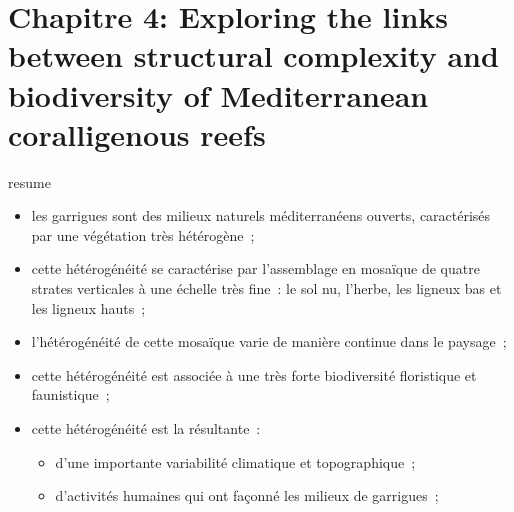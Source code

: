 \chapter[Exploring the links between structural complexity and biodiversity of Mediterranean coralligenous reefs]{Chapitre 4: Exploring the links between structural complexity and biodiversity of Mediterranean coralligenous reefs} \label{chapitre4-structure}

\pagestyle{main}



\begin{center}
\begin{colbox}{resume}
  \vspace{-2pt}
{\color{textresume}\small
\begin{itemize}[leftmargin=0in]\itemsep3pt
\item les garrigues sont des milieux naturels méditerranéens ouverts, caractérisés par une végétation très hétérogène~;
\item cette hétérogénéité se caractérise par l'assemblage en mosaïque de quatre strates verticales à une échelle très fine~: le sol nu, l'herbe, les ligneux bas et les ligneux hauts~;
\item l'hétérogénéité de cette mosaïque varie de manière continue dans le paysage~;
\item cette hétérogénéité est associée à une très forte biodiversité floristique et faunistique~;
\item cette hétérogénéité est la résultante~:
\begin{itemize}
  \item d'une importante variabilité climatique et topographique~;
  \item d'activités humaines qui ont façonné les milieux de garrigues~;
\end{itemize}
\end{itemize}
}
\vspace{-2pt}
\end{colbox}
\end{center}

